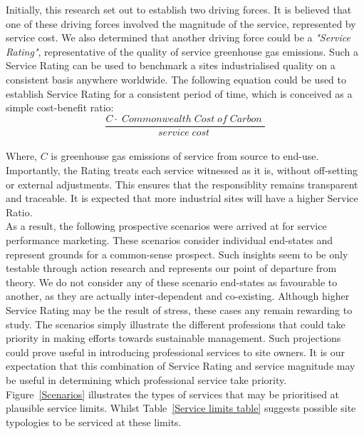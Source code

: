 Initially, this research set out to establish two driving forces.
It is believed that one of these driving forces involved the magnitude of the service, represented by service cost.
We also determined that another driving force could be a \emph{"Service Rating"}, representative of the quality of service greenhouse gas emissions.
Such a Service Rating can be used to benchmark a sites industrialised quality on a consistent basis anywhere worldwide.
The following equation could be used to establish Service Rating for a consistent period of time, which is conceived as a simple cost-benefit ratio:\\

\begin{equation}
	\frac{C  \cdot \;Commonwealth\; Cost\; of\; Carbon\;}{service\; cost\;}
\end{equation}\\

Where, $C$ is greenhouse gas emissions of service from source to end-use.
Importantly, the Rating treats each service witnessed as it is, without off-setting or external adjustments.
This ensures that the responsiblity remains transparent and traceable.
It is expected that more industrial sites will have a higher Service Ratio.\\

As a result, the following prospective scenarios were arrived at for service performance marketing.
These scenarios consider individual end-states and represent grounds for a common-sense prospect.
Such insights seem to be only testable through action research and represents our point of departure from theory.
We do not consider any of these scenario end-states as favourable to another, as they are actually inter-dependent and co-existing.
Although higher Service Rating may be the result of stress, these cases any remain rewarding to study.
The scenarios simply illustrate the different professions that could take priority in making efforts towards sustainable management.
Such projections could prove useful in introducing professional services to site owners.
It is our expectation that this combination of Service Rating and service magnitude may be useful in determining which professional service take priority.
Figure~\ref{Scenarios} illustrates the types of services that may be prioritised at plausible service limits.
Whilst Table~\ref{Service limits table} suggests possible site typologies to be serviced at these limits.\\

